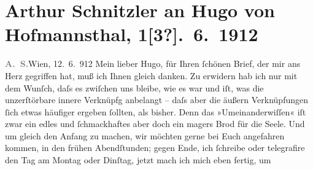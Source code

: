 

         
         \newcommand{\erwaehntePersonen}{Personen: Hugo von Hofmannsthal}
         \newcommand{\erwaehnteOrte}{Orte: Neues Deutsches Theater, Prag, Wien}
         \newcommand{\erwaehnteWerke}{Werke: Der einsame Weg. Schauspiel in fünf Akten, Tagebuch}
               \section[Arthur Schnitzler an Hugo von Hofmannsthal, 1{[}3?{]}. 6. 1912]{ Arthur Schnitzler an Hugo von Hofmannsthal, 1{[}3?{]}. 6. 1912}\nopagebreak{}\rehead{ }\begin{ledgroupsized}[t]{13cm}\normalsize\beginnumbering \toendnotes[C]{\smallbreak\pagebreak[2]} 
\toendnotes[C]{\smallbreak}\pstart
           {\pb}\textcolor{gray}{\textbf{A. S.}}\hfill Wien, 12. 6. 912\pend
           \pstart
           Mein lieber Hugo, für Ihren ſchönen Brief, der mir ans Herz
               gegriffen hat, muß ich Ihnen gleich danken. Zu erwidern hab ich nur mit dem Wunſch,
               daſs es zwiſchen uns bleibe, wie es war und iſt, was die unzerſtörbare innere
               Verknüpfg anbelangt – daſs aber die äußern Verknüpfungen ſich etwas {\pb}häufiger ergeben ſollten, als bisher. Denn das
               »Umeinanderwiſſen« iſt zwar ein edles und ſchmackhaftes aber doch ein magers Brod für
               die Seele. Und um gleich den Anfang zu machen, wir möchten gerne \label{K_L02075_1v}\label{K_L02075_1h} bei Euch angefahren kommen, in den frühen Abendſtunden; gegen Ende, ich
               ſchreibe oder telegrafire den Tag \introOben{}am\introOben{} Montag oder Dinſtag,
                  {\pb}jetzt mach ich mich eben fertig, um \label{K_L02075_2v}
\end{ledgroupsized}
